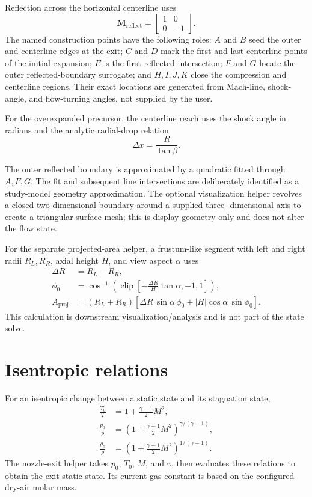 \documentclass[11pt]{article}
\newcommand{\Mach}{\mathit{M}}
\newcommand{\gammaa}{\gamma}
\begin{document}
Reflection across the horizontal centerline uses
\begin{equation}
  \mathbf{M}_{\mathrm{reflect}}=
  \begin{bmatrix}1&0\\0&-1\end{bmatrix}.
\end{equation}
The named construction points have the following roles: \(A\) and \(B\) seed
the outer and centerline edges at the exit; \(C\) and \(D\) mark the first and
last centerline points of the initial expansion; \(E\) is the first reflected
intersection; \(F\) and \(G\) locate the outer reflected-boundary surrogate;
and \(H,I,J,K\) close the compression and centerline regions.  Their exact
locations are generated from Mach-line, shock-angle, and flow-turning angles,
not supplied by the user.

For the overexpanded precursor, the centerline reach uses the shock angle in
radians and the analytic radial-drop relation
\begin{equation}
  \Delta x=\frac{R}{\tan\beta}.
\end{equation}

The outer reflected boundary is approximated by a quadratic fitted through
\(A,F,G\).  The fit and subsequent line intersections are deliberately
identified as a study-model geometry approximation.  The optional visualization
helper revolves a closed two-dimensional boundary around a supplied three-
dimensional axis to create a triangular surface mesh; this is display geometry
only and does not alter the flow state.

For the separate projected-area helper, a frustum-like segment with left and
right radii \(R_L,R_R\), axial height \(H\), and view aspect \(\alpha\) uses
\begin{align}
  \Delta R &= R_L-R_R, \\
  \phi_0 &= \cos^{-1}\!\left(\operatorname{clip}\left[-\frac{\Delta R}{H}\tan\alpha,-1,1\right]\right), \\
  A_{\mathrm{proj}} &= (R_L+R_R)\left[\Delta R\,\sin\alpha\,\phi_0
    + |H|\cos\alpha\,\sin\phi_0\right].
\end{align}
This calculation is downstream visualization/analysis and is not part of the
state solve.

\section{Isentropic relations}

For an isentropic change between a static state and its stagnation state,
\begin{align}
  \frac{T_0}{T} &= 1 + \frac{\gammaa-1}{2}\Mach^2, \\
  \frac{p_0}{p} &=
    \left(1 + \frac{\gammaa-1}{2}\Mach^2\right)^{\gammaa/(\gammaa-1)}, \\
  \frac{\rho_0}{\rho} &=
    \left(1 + \frac{\gammaa-1}{2}\Mach^2\right)^{1/(\gammaa-1)}.
\end{align}
The nozzle-exit helper takes \(p_0\), \(T_0\), \(\Mach\), and \(\gammaa\),
then evaluates these relations to obtain the exit static state.  Its current
gas constant is based on the configured dry-air molar mass.
\end{document}
